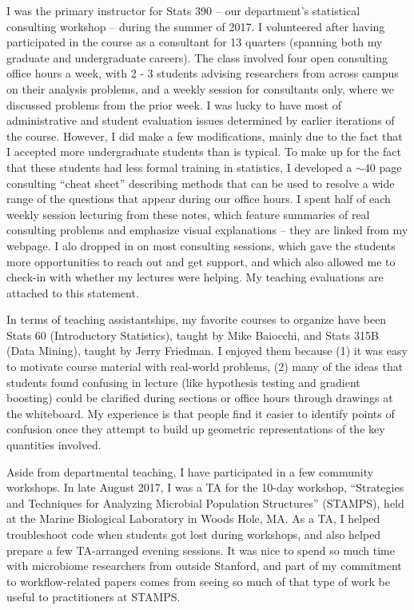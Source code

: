 \documentclass{article}
\begin{document}
I was the primary instructor for Stats 390 -- our department's statistical
consulting workshop -- during the summer of 2017. I volunteered after having
participated in the course as a consultant for 13 quarters (spanning both my
graduate and undergraduate careers). The class involved four open consulting
office hours a week, with 2 - 3 students advising researchers from across campus
on their analysis problems, and a weekly session for consultants only, where we
discussed problems from the prior week. I was lucky to have most of
administrative and student evaluation issues determined by earlier iterations of
the course. However, I did make a few modifications, mainly due to the fact that
I accepted more undergraduate students than is typical. To make up for the fact
that these students had less formal training in statistics, I developed a $\sim
40$ page consulting ``cheat sheet'' describing methods that can be used to
resolve a wide range of the questions that appear during our office hours. I
spent half of each weekly session lecturing from these notes, which feature
summaries of real consulting problems and emphasize visual explanations -- they
are linked from my webpage. I alo dropped in on most consulting sessions, which
gave the students more opportunities to reach out and get support, and which
also allowed me to check-in with whether my lectures were helping. My teaching
evaluations are attached to this statement.

In terms of teaching assistantships, my favorite courses to organize have been
Stats 60 (Introductory Statistics), taught by Mike Baiocchi, and Stats 315B
(Data Mining), taught by Jerry Friedman. I enjoyed them because (1) it was easy
to motivate course material with real-world problems, (2) many of the ideas that
students found confusing in lecture (like hypothesis testing and gradient
boosting) could be clarified during sections or office hours through drawings at
the whiteboard. My experience is that people find it easier to identify points
of confusion once they attempt to build up geometric representations of the key
quantities involved.

Aside from departmental teaching, I have participated in a few community
workshops. In late August 2017, I was a TA for the 10-day workshop, ``Strategies
and Techniques for Analyzing Microbial Population Structures'' (STAMPS), held at
the Marine Biological Laboratory in Woods Hole, MA. As a TA, I helped
troubleshoot code when students got lost during workshops, and also helped
prepare a few TA-arranged evening sessions. It was nice to spend so much time
with microbiome researchers from outside Stanford, and part of my commitment to
workflow-related papers comes from seeing so much of that type of work be useful
to practitioners at STAMPS.
\end{document}
